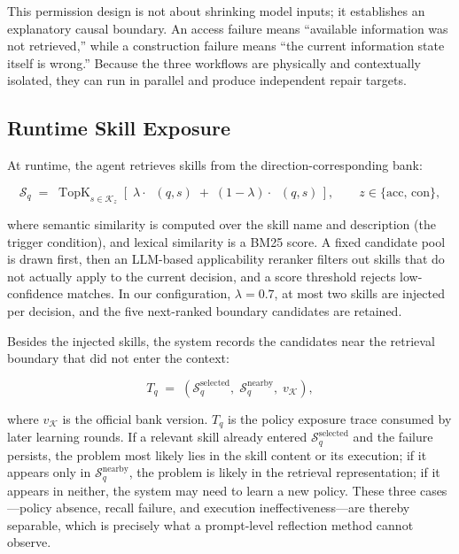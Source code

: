 \documentclass[11pt]{article}
\newcommand{\KK}{\mathcal{K}}
\DeclareMathOperator{\TopK}{TopK}
\DeclareMathOperator{\simsem}{sim_{sem}}
\DeclareMathOperator{\simlex}{sim_{lex}}
\begin{document}
This permission design is not about shrinking model inputs; it establishes an
explanatory causal boundary. An access failure means ``available information was
not retrieved,'' while a construction failure means ``the current information
state itself is wrong.'' Because the three workflows are physically and
contextually isolated, they can run in parallel and produce independent repair
targets.

\subsection{Runtime Skill Exposure}
\label{sec:method-exposure}

At runtime, the agent retrieves skills from the direction-corresponding bank:

\begin{equation}
\label{eq:skillretr}
\mathcal{S}_q \;=\; \TopK_{s \in \KK_z}\left[\;
\lambda \cdot \simsem(q, s) \;+\; (1-\lambda) \cdot \simlex(q, s)
\,\right], \qquad z \in \{\mathrm{acc},\,\mathrm{con}\},
\end{equation}

\noindent where semantic similarity is computed over the skill name and
description (the trigger condition), and lexical similarity is a BM25 score.
A fixed candidate pool is drawn first, then an LLM-based applicability reranker
filters out skills that do not actually apply to the current decision, and a
score threshold rejects low-confidence matches. In our configuration,
$\lambda = 0.7$, at most two skills are injected per decision, and the five
next-ranked boundary candidates are retained.

Besides the injected skills, the system records the candidates near the
retrieval boundary that did not enter the context:

\begin{equation}
\label{eq:trace}
T_q \;=\; \left(\mathcal{S}_q^{\mathrm{selected}},\;
\mathcal{S}_q^{\mathrm{nearby}},\; v_{\KK}\right),
\end{equation}

\noindent where $v_{\KK}$ is the official bank version. $T_q$ is the policy
exposure trace consumed by later learning rounds. If a relevant skill already
entered $\mathcal{S}_q^{\mathrm{selected}}$ and the failure persists, the
problem most likely lies in the skill content or its execution; if it appears
only in $\mathcal{S}_q^{\mathrm{nearby}}$, the problem is likely in the retrieval
representation; if it appears in neither, the system may need to learn a new
policy. These three cases---policy absence, recall failure, and execution
ineffectiveness---are thereby separable, which is precisely what a
prompt-level reflection method cannot observe.
\end{document}
